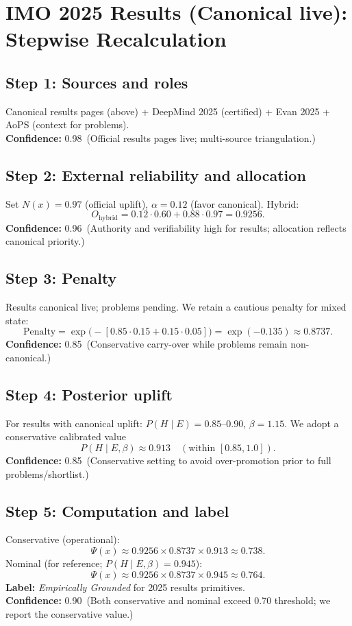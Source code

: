 \documentclass[11pt]{article}
\newcommand{\Nx}{N(x)}
\newcommand{\Px}{\Psi(x)}
\newcommand{\post}{P(H\mid E,\beta)}
\newcommand{\pen}{\mathrm{Penalty}}
\newcommand{\conf}[2]{\textbf{Confidence:} #1\ (#2)}
\begin{document}
\section{IMO 2025 Results (Canonical live): Stepwise Recalculation}
\subsection*{Step 1: Sources and roles}
Canonical results pages (above) + DeepMind 2025 (certified) + Evan 2025 + AoPS (context for problems).\\
\conf{0.98}{Official results pages live; multi-source triangulation.}

\subsection*{Step 2: External reliability and allocation}
Set $\Nx=0.97$ (official uplift), $\alpha=0.12$ (favor canonical). Hybrid:
\[
O_{\text{hybrid}} = 0.12\cdot 0.60 + 0.88\cdot 0.97 = 0.9256.
\]
\conf{0.96}{Authority and verifiability high for results; allocation reflects canonical priority.}

\subsection*{Step 3: Penalty}
Results canonical live; problems pending. We retain a cautious penalty for mixed state:
\[
\pen=\exp\!\bigl(-[0.85\cdot 0.15 + 0.15\cdot 0.05]\bigr)=\exp(-0.135)\approx 0.8737.
\]
\conf{0.85}{Conservative carry-over while problems remain non-canonical.}

\subsection*{Step 4: Posterior uplift}
For results with canonical uplift: $P(H\mid E)=0.85$--$0.90$, $\beta=1.15$. We adopt a conservative calibrated value
\[
\post \approx 0.913\quad(\text{within }[0.85,1.0]).
\]
\conf{0.85}{Conservative setting to avoid over-promotion prior to full problems/shortlist.}

\subsection*{Step 5: Computation and label}
Conservative (operational):
\[
\Px \approx 0.9256 \times 0.8737 \times 0.913 \approx 0.738.
\]
Nominal (for reference; $\post=0.945$):
\[
\Px \approx 0.9256 \times 0.8737 \times 0.945 \approx 0.764.
\]
\textbf{Label:} \emph{Empirically Grounded} for 2025 results primitives.\\
\conf{0.90}{Both conservative and nominal exceed 0.70 threshold; we report the conservative value.}
\end{document}
